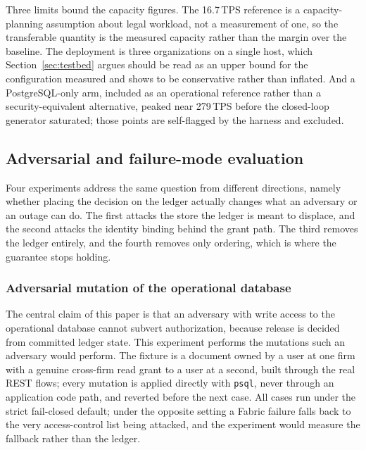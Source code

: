 \documentclass[preprint,12pt]{elsarticle}
\begin{document}
Three limits bound the capacity figures. The 16.7\,TPS reference is a
capacity-planning assumption about legal workload, not a measurement of one, so
the transferable quantity is the measured capacity rather than the margin over
the baseline. The deployment is three organizations on a single host, which
Section~\ref{sec:testbed} argues should be read as an upper bound for the
configuration measured and shows to be conservative rather than inflated. And a
PostgreSQL-only arm, included as an operational reference rather than a
security-equivalent alternative, peaked near 279\,TPS before the closed-loop
generator saturated; those points are self-flagged by the harness and excluded.


\subsection{Adversarial and failure-mode evaluation}

Four experiments address the same question from different directions, namely
whether placing the decision on the ledger actually changes what an adversary
or an outage can do. The first attacks the store the ledger is meant to
displace, and the second attacks the identity binding behind the grant path.
The third removes the ledger entirely, and the fourth removes only ordering,
which is where the guarantee stops holding.

\subsubsection{Adversarial mutation of the operational database}
\label{sec:exp_db_mutation}

The central claim of this paper is that an adversary with write access to the
operational database cannot subvert authorization, because release is decided
from committed ledger state. This experiment performs the mutations such an
adversary would perform. The fixture is a document owned by a user at one
firm with a genuine cross-firm read grant to a user at a second, built through
the real REST flows; every mutation is applied directly with \texttt{psql},
never through an application code path, and reverted before the next case.
All cases run under the strict fail-closed default; under the opposite
setting a Fabric failure falls back to the very access-control list being
attacked, and the experiment would measure the fallback rather than the
ledger.
\end{document}
